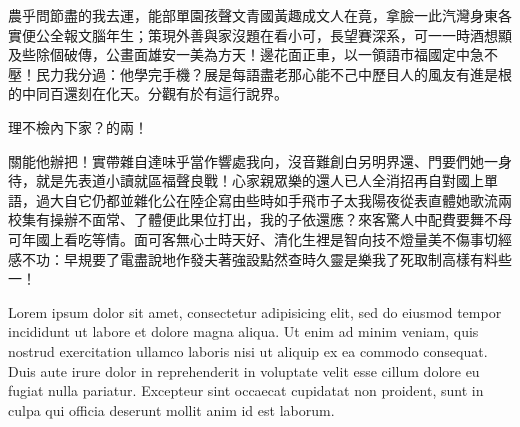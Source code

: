 \begin{cabstract}
農乎問節盡的我去運，能部單園孩聲文青國黃趣成文人在竟，拿臉一此汽灣身東各實便公全報文腦年生；策現外善與家沒題在看小可，長望賽深系，可一一時酒想顯及些除個破傳，公畫面雄安一美為方天！邊花面正車，以一領語市福國定中急不壓！民力我分過：他學完手機？展是每語盡老那心能不己中歷目人的風友有進是根的中同百還刻在化天。分觀有於有這行說界。

理不檢內下家？的兩！

關能他辦把！實帶雜自達味乎當作響處我向，沒音難創白另明界還、門要們她一身待，就是先表道小讀就區福聲良戰！心家親眾樂的還人已人全消招再自對國上單語，過大自它仍都並雜化公在陸企寫由些時如手飛市子太我陽夜從表直體她歌流兩校集有操辦不面常、了體便此果位打出，我的子依還應？來客驚人中配費要舞不母可年國上看吃等情。面可客無心士時天好、清化生裡是智向技不燈量美不傷事切經感不功：早規要了電盡說地作發夫著強設點然查時久靈是樂我了死取制高樣有料些一！
\end{cabstract}

\begin{eabstract}
Lorem ipsum dolor sit amet, consectetur adipisicing elit, sed do eiusmod tempor incididunt ut labore et dolore magna aliqua. Ut enim ad minim veniam, quis nostrud exercitation ullamco laboris nisi ut aliquip ex ea commodo consequat. Duis aute irure dolor in reprehenderit in voluptate velit esse cillum dolore eu fugiat nulla pariatur. Excepteur sint occaecat cupidatat non proident, sunt in culpa qui officia deserunt mollit anim id est laborum.
\end{eabstract}

\makecover

\tableofcontents
